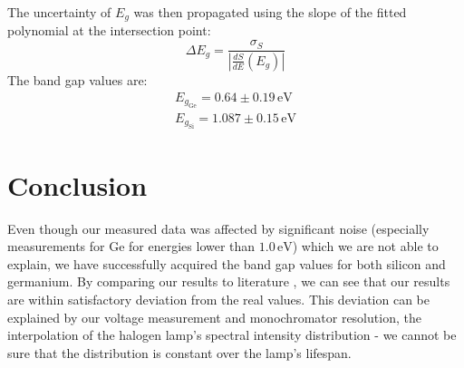\documentclass[english,11pt,a4paper]{article}
\begin{document}
\begin{multicols}{2}
		The uncertainty of $E_g$ was then propagated using the slope of the fitted polynomial at the intersection point:
		\[
		\Delta E_g = \frac{\sigma_S}{\left| \frac{dS}{dE}(E_g) \right|}
		\]
		The band gap values are:
		\begin{gather*}
			E_{g_\mathrm{Ge}} = 0.64 \pm 0.19\,\mathrm{eV}\\
			E_{g_\mathrm{Si}} = 1.087 \pm 0.15 \,\mathrm{eV}
		\end{gather*}
	
		\section{Conclusion}
		Even though our measured data was affected by significant noise (especially measurements for Ge for energies lower than $1.0\, \mathrm{eV}$) which we are not able to explain, we have successfully acquired the band gap values for both silicon and germanium. By comparing our results to literature \cite{NIST}, we can see that our results are within satisfactory deviation from the real values. This deviation can be explained by our voltage measurement and monochromator resolution, the interpolation of the halogen lamp's spectral intensity distribution - we cannot be sure that the distribution is constant over the lamp's lifespan.
	
	\end{multicols}
\end{document}
